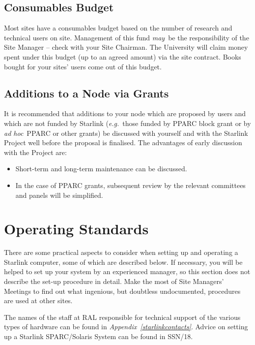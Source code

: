 \documentclass[twoside,11pt]{article}
\newcommand{\xref}[3]{#1}
\begin{document}
\subsection{Consumables Budget}

Most sites have a consumables budget based on the number of research
and technical users on site.
Management of this fund {\em may}\, be the responsibility of the Site Manager --
check with your Site Chairman.
The University will claim money spent under this budget (up to an agreed
amount) via the site contract.
Books bought for your sites' users come out of this budget.

\subsection {Additions to a Node via Grants}

It is recommended that additions to your node which are proposed by users and
which are not funded by Starlink ({\em e.g.}\, those funded by PPARC block
grant or by {\em ad hoc}\, PPARC or other grants) be discussed with yourself
and with the Starlink Project well before the proposal is finalised.
The advantages of early discussion with the Project are:

\begin{itemize}
\item Short-term and long-term maintenance can be discussed.
\item In the case of PPARC grants, subsequent review by the relevant
 committees and panels will be simplified.
\end{itemize}

\newpage

\section{\label{operatingstandards}Operating Standards}

There are some practical aspects to consider when setting up and operating a
Starlink computer, some of which are described below.
If necessary, you will be helped to set up your system by an experienced
manager, so this section does not describe the set-up procedure in detail.
Make the most of Site Managers' Meetings to find out what ingenious, but
doubtless undocumented, procedures are used at other sites.

The names of the staff at RAL responsible for technical support
of the various types of hardware can be found in
{\em Appendix~\ref{starlinkcontacts}}.
Advice on setting up a Starlink SPARC/Solaris System can be found in
\xref{SSN/18}{ssn18}{}.
\end{document}
